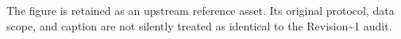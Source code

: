 The figure is retained as an upstream reference asset. Its original protocol, data scope, and caption are not silently treated as identical to the Revision\textasciitilde{}1 audit.
